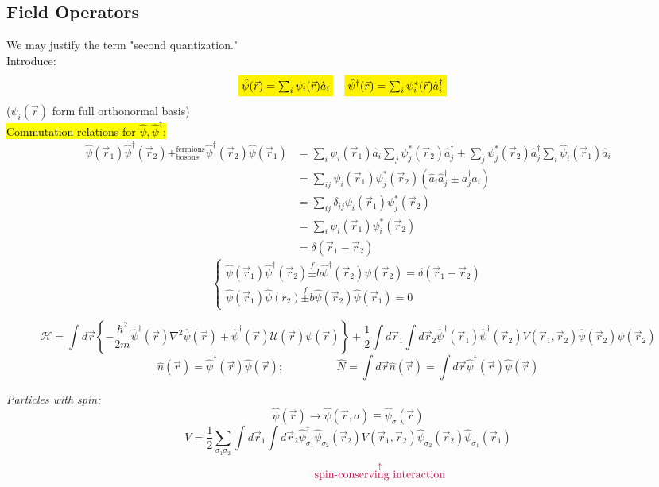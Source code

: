 \documentclass[10pt]{article}
\newcommand{\smallspace}{\hspace{2cm}}
\begin{document}
\subsection{Field Operators}
We may justify the term "second quantization."\\
\noindent Introduce:
\begin{align*}
    &\colorbox{yellow}{$\hat \psi(\vec r) = \sum_{i}\psi_i(\vec r) \hat a_i$} & &\colorbox{yellow}{$\hat \psi^\dagger(\vec r) = \sum_i \psi_i^\ast(\vec r)\hat a_i^\dagger$}
\end{align*}
($\psi_i(\vec r)$ form full orthonormal basis)\\
\hl{Commutation relations for $\hat \psi, \hat \psi^\dagger$:}
\begin{align*}
    \hat \psi(\vec r_1) \hat \psi^\dagger (\vec r_2) {\pm}^{\text{fermions}}_{\text{bosons}}  \hat \psi^\dagger(\vec r_2)\hat\psi(\vec r_1) &= \sum_{i}\psi_i(\vec r_1)\hat a_i \sum_{j}\psi^\ast_{j}(\vec r_2)\hat a_j^\dagger \pm \sum_j \psi_j^\ast(\vec r_2)\hat a_j^\dagger \sum_{i}\hat \psi_i(\vec r_1) \hat a_i\\
              &= \sum_{ij}\psi_i(\vec r_1)\psi_j^\ast(\vec r_2)(\hat a_i \hat a_j^\dagger \pm a_j^\dagger a_i)\\
              &= \sum_{ij}\delta_{ij}\psi_i(\vec r_1)\psi_j^\ast(\vec r_2)\\
              &= \sum_i \psi_i(\vec r_1) \psi_i^\ast(\vec r_2) \\
              &= \delta(\vec r_1- \vec r_2)
\end{align*}
\[
\begin{cases}
    \hat \psi(\vec r_1) \hat \psi^\dagger(\vec r_2) \stackrel{f}{\pm}{b} \hat \psi^\dagger(\vec r_2)\psi(\vec r_2) = \delta(\vec r_1 - \vec r_2)\\
    \hat \psi(\vec r_1)\hat \psi(r_2) \stackrel{f}{\pm}{b} \hat \psi(\vec r_2) \hat \psi(\vec r_1) = 0
\end{cases}
\]
\begin{tcolorbox}[colframe = red, colback = white]
$$
\mathcal H = \int d\vec r \left \{-\frac{\hbar^2}{2m}\hat \psi^\dagger(\vec r)\nabla^2\hat\psi(\vec r) + \hat \psi^\dagger(\vec r)\mathcal U(\vec r)\psi(\vec r)\right \}
+ \frac{1}{2}\int d\vec r_1 \int d\vec r_2 \hat \psi^\dagger(\vec r_1)\hat \psi^\dagger(\vec r_2)V(\vec r_1, \vec r_2) \hat \psi(\vec r_2)\psi(\vec r_2)
$$
$$
\hat n(\vec r) = \hat\psi^\dagger(\vec r)\hat \psi(\vec r); \smallspace \hat N = \int d\vec r \hat n(\vec r) = \int d\vec r \hat \psi^\dagger(\vec r) \hat \psi(\vec r)
$$
\end{tcolorbox}
\textit{Particles with spin:}
$$
\hat \psi(\vec r) \longrightarrow \hat \psi(\vec r, \sigma) \equiv \hat \psi_\sigma(\vec r)
$$
$$
V = \frac{1}{2}\sum_{\sigma_1 \sigma_2} \int  d\vec r_1 \int d\vec r_2 \hat \psi_{\sigma_1}^\dagger \hat \psi_{\sigma_2}(\vec r_2)V(\vec r_1, \vec r_2)\hat \psi_{\sigma_2}(\vec r_2)\hat \psi_{\sigma_1}(\vec r_1)
$$
$$
\smallspace \stackrel{\textcolor{purple}{\uparrow}}{\textcolor{purple}{\text{spin-conserving interaction}}}
$$
\end{document}
